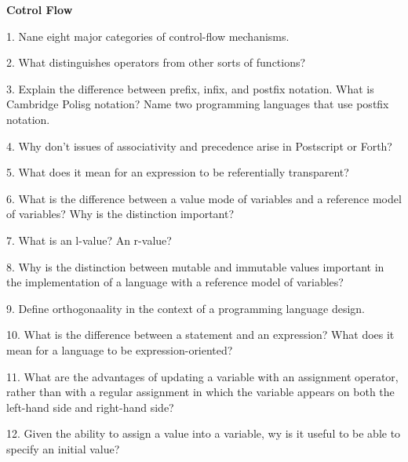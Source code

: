 \centerline{\bf Cotrol Flow}

\vskip 1cm

1. Nane eight major categories of control-flow mechanisms.

\filbreak
\vskip 1cm

2. What distinguishes operators from other sorts of functions?

\filbreak
\vskip 1cm

3. Explain the difference between prefix, infix, and postfix notation. What is Cambridge Polisg notation? Name two programming languages that use postfix notation.

\filbreak
\vskip 1cm

4. Why don't issues of associativity and precedence arise in Postscript or Forth?

\filbreak
\vskip 1cm

5. What does it mean for an expression to be referentially transparent?

\filbreak
\vskip 1cm

6. What is the difference between a value mode of variables and a reference model of variables? Why is the distinction important?

\filbreak
\vskip 1cm

7. What is an l-value? An r-value?

\filbreak
\vskip 1cm

8. Why is the distinction between mutable and immutable values important in the implementation of a language with a reference model of variables?

\filbreak
\vskip 1cm

9. Define orthogonaality in the context of a programming language design.

\filbreak
\vskip 1cm

10. What is the difference between a statement and an expression? What does it mean for a language to be expression-oriented?

\filbreak
\vskip 1cm

11. What are the advantages of updating a variable with an assignment operator, rather than with a regular assignment in which the variable appears on both the left-hand side and right-hand side?

\filbreak
\vskip 1cm

12. Given the ability to assign a value into a variable, wy is it useful to be able to specify an initial value?

\filbreak
\vskip 1cm

